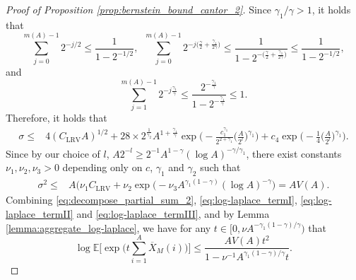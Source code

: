 \documentclass[11pt]{article}
\theoremstyle{plain}
\theoremstyle{definition}
\begin{document}
\begin{proof}[Proof of Proposition \ref{prop:bernstein_bound_cantor_2}]
Since $\gamma_1/\gamma > 1$, it holds that
\begin{equation*}
    \sum_{j = 0}^{m(A)-1}2^{-j/2} \leq \frac{1}{1-2^{-1/2}}, \;\; \sum_{j = 0}^{m(A)-1}2^{-j\big(\frac{\gamma}{2}+\frac{\gamma_1}{2\gamma}\big)} \leq \frac{1}{1-2^{-\big(\frac{\gamma}{2}+\frac{\gamma_1}{2\gamma}\big)}} \leq \frac{1}{1-2^{-1/2}},
\end{equation*}
and
\begin{equation*}
    \sum_{j = 1}^{m(A)-1}2^{-j\frac{\gamma_1}{\gamma}} \leq \frac{2^{-\frac{\gamma_1}{\gamma}}}{1-2^{-\frac{\gamma_1}{\gamma}}} \leq 1.
\end{equation*}
Therefore, it holds that
\begin{equation*}
\begin{aligned}
    \sigma \leq& 4(C_{\mathrm{LRV}}A)^{1/2} + 28\times 2^{\frac{1}{\gamma_2}}A^{1+\frac{\gamma_1}{\gamma}}\exp\bigg(-\frac{c_1^{\gamma_1}}{2^{2+\gamma_1}}\bigg(\frac{A}{2^l}\bigg)^{\gamma_1}\bigg) + c_4\exp\bigg(-\frac{1}{4}\bigg(\frac{A}{2^l}\bigg)^{\gamma_1}\bigg).
\end{aligned}
\end{equation*}
Since by our choice of $l$, $A2^{-l} \geq 2^{-1}A^{1-\gamma}(\log A)^{-\gamma/\gamma_1}$, there exist constants $\nu_1, \nu_2, \nu_3 > 0$ depending only on $c$, $\gamma_1$ and $\gamma_2$ such that
\begin{equation*}
\begin{aligned}
    \sigma^2 \leq& A(\nu_1 C_{\mathrm{LRV}} + \nu_2\exp\big(-\nu_3A^{\gamma_1(1-\gamma)}(\log A)^{-\gamma}\big) = AV(A).
\end{aligned}
\end{equation*}
Combining \eqref{eq:decompose_partial_sum_2}, \eqref{eq:log-laplace_termI}, \eqref{eq:log-laplace_termII} and \eqref{eq:log-laplace_termIII}, and by Lemma \ref{lemma:aggregate_log-laplace}, we have for any $t \in [0,\nu A^{-\gamma_1(1-\gamma)/\gamma})$ that
\begin{equation*}
    \log\mathbb{E}\Big[\exp\Big(t\sum_{i = 1}^A\overline{X}_M(i)\Big)\Big] \leq \frac{AV(A)t^2}{1-\nu^{-1}A^{\gamma_1(1-\gamma)/\gamma}t}.
\end{equation*}
\end{proof}
\end{document}
